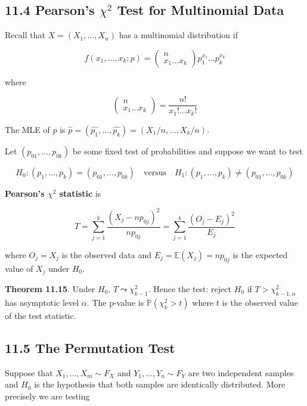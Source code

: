 \subsection{\texorpdfstring{11.4 Pearson's \(\chi^2\) Test for
Multinomial
Data}{11.4 Pearson's \textbackslash chi\^{}2 Test for Multinomial Data}}\label{pearsons-chi2-test-for-multinomial-data}

Recall that \(X = (X_1, \dots, X_n)\) has a multinomial distribution if

\[ f(x_1, \dots, x_k; p) = \begin{pmatrix}
n \\
x_1 \dots x_k
\end{pmatrix} p_1^{x_1} \dots p_k^{x_k}\]

where

\[
\begin{pmatrix}
n \\
x_1 \dots x_k
\end{pmatrix} = 
\frac{n!}{x_1! \dots x_k!}
\]

The MLE of \(p\) is
\(\hat{p} = (\hat{p_1}, \dots, \hat{p_k}) = \left(X_1 / n, \dots, X_k / n\right)\).

Let \((p_{01}, \dots, p_{0k})\) be some fixed test of probabilities and
suppose we want to test

\[ H_0: (p_1, \dots, p_k) = (p_{01}, \dots, p_{0k})
\quad \text{versus} \quad
H_1: (p_1, \dots, p_k) \neq (p_{01}, \dots, p_{0k})\]

\textbf{Pearson's \(\chi^2\) statistic} is

\[ T = \sum_{j=1}^k \frac{(X_j - np_{0j})^2}{np_{0j}} = \sum_{j=1}^k \frac{(O_j - E_j)^2}{E_j}\]

where \(O_j = X_j\) is the observed data and
\(E_j = \mathbb{E}(X_j) = np_{0j}\) is the expected value of \(X_j\)
under \(H_0\).

\textbf{Theorem 11.15}. Under \(H_0\), \(T \leadsto \chi^2_{k - 1}\).
Hence the test: reject \(H_0\) if \(T > \chi^2_{k - 1, \alpha}\) has
asymptotic level \(\alpha\). The p-value is \(\mathbb{P}(\chi^2_k > t)\)
where \(t\) is the observed value of the test statistic.

\subsection{11.5 The Permutation Test}\label{the-permutation-test}

Suppose that \(X_1, \dots, X_m \sim F_X\) and
\(Y_1, \dots, Y_n \sim F_Y\) are two independent samples and \(H_0\) is
the hypothesis that both samples are identically distributed. More
precisely we are testing

